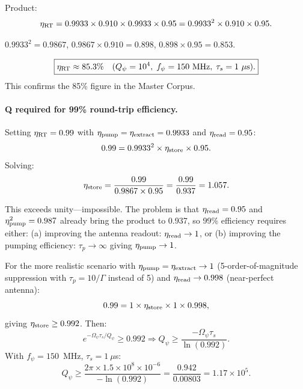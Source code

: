 \documentclass[aps,prd,twocolumn,superscriptaddress,nofootinbib]{revtex4-2}
\newcommand{\Qpsi}{Q_\psi}
\newcommand{\Opsi}{\Omega_\psi}
\begin{document}
Product:
\begin{equation}
\eta_{\rm RT} = 0.9933\times0.910\times0.9933\times0.95
= 0.9933^2\times0.910\times0.95.
\end{equation}

$0.9933^2 = 0.9867$, $0.9867\times0.910 = 0.898$,
$0.898\times0.95 = 0.853$.

\begin{equation}
\boxed{\eta_{\rm RT} \approx 85.3\%\quad(\Qpsi = 10^4,\;
f_\psi = 150~\text{MHz},\;\tau_s = 1~\mu\text{s}).}
\end{equation}
This confirms the 85\% figure in the Master Corpus.

\paragraph{Q required for 99\% round-trip efficiency.}
Setting $\eta_{\rm RT} = 0.99$ with $\eta_{\rm pump} = \eta_{\rm extract}
= 0.9933$ and $\eta_{\rm read} = 0.95$:
\begin{equation}
0.99 = 0.9933^2\times\eta_{\rm store}\times0.95.
\end{equation}
Solving:
\begin{equation}
\eta_{\rm store} = \frac{0.99}{0.9867\times0.95} = \frac{0.99}{0.937} = 1.057.
\end{equation}

This exceeds unity---impossible.  The problem is that $\eta_{\rm read} = 0.95$
and $\eta_{\rm pump}^2 = 0.987$ already bring the product to 0.937, so
99\% efficiency requires either:
(a) improving the antenna readout: $\eta_{\rm read} \to 1$, or
(b) improving the pumping efficiency: $\tau_p \to \infty$ giving
$\eta_{\rm pump} \to 1$.

For the more realistic scenario with $\eta_{\rm pump} = \eta_{\rm extract}
\to 1$ (5-order-of-magnitude suppression with $\tau_p = 10/\Gamma$ instead of
5) and $\eta_{\rm read} \to 0.998$ (near-perfect antenna):
\begin{equation}
0.99 = 1\times\eta_{\rm store}\times1\times0.998,
\end{equation}
giving $\eta_{\rm store} \geq 0.992$.  Then:
\begin{equation}
e^{-\Opsi\tau_s/\Qpsi} \geq 0.992
\Rightarrow
\Qpsi \geq \frac{-\Opsi\tau_s}{\ln(0.992)}.
\end{equation}
With $f_\psi = 150$~MHz, $\tau_s = 1~\mu$s:
\begin{equation}
\Qpsi \geq \frac{2\pi\times1.5\times10^8\times10^{-6}}{-\ln(0.992)}
= \frac{0.942}{0.00803}
= 1.17\times10^5.
\end{equation}
\end{document}
